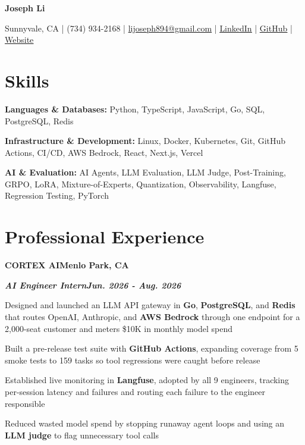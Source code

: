\documentclass[10pt]{article}
\renewcommand{\resumeheader}[2]{%
  {\centering\fontsize{16}{18}\selectfont\bfseries #1\par}%
  \vspace{4pt}%
  {\centering\fontsize{10.5}{13}\selectfont #2\par}%
  \vspace{6pt}%
}
\renewcommand{\skill}[2]{\textbf{#1:} #2\par\vspace{1.5pt}}
\newcommand{\job}[4]{%
  \vspace{0pt}%
  \textbf{\MakeUppercase{#1}}\hfill\textbf{#2}\par
  \vspace{0.5pt}%
  \textbf{\textit{#3}}\hfill\textbf{\textit{#4}}\par
}
\begin{document}
\resumeheader{Joseph Li}{%
Sunnyvale, CA | (734) 934-2168 | \href{mailto:lijoseph894@gmail.com}{lijoseph894@gmail.com} | \href{https://www.linkedin.com/in/lijoseph894/}{\underline{LinkedIn}} | \href{https://github.com/josephl894}{\underline{GitHub}} | \href{https://josephl894.github.io}{\underline{Website}}}

\section{Skills}
\skill{Languages \& Databases}{Python, TypeScript, JavaScript, Go, SQL, PostgreSQL, Redis}
\skill{Infrastructure \& Development}{Linux, Docker, Kubernetes, Git, GitHub Actions, CI/CD, AWS Bedrock, React, Next.js, Vercel}
\skill{AI \& Evaluation}{AI Agents, LLM Evaluation, LLM Judge, Post-Training, GRPO, LoRA, Mixture-of-Experts, Quantization, Observability, Langfuse, Regression Testing, PyTorch}

\section{Professional Experience}
\job{Cortex AI}{Menlo Park, CA}{AI Engineer Intern}{Jun. 2026 - Aug. 2026}
\begin{bullets}
  \item Designed and launched an LLM API gateway in \textbf{Go}, \textbf{PostgreSQL}, and \textbf{Redis} that routes OpenAI, Anthropic, and \textbf{AWS Bedrock} through one endpoint for a 2,000-seat customer and meters \$10K in monthly model spend
  \item Built a pre-release test suite with \textbf{GitHub Actions}, expanding coverage from 5 smoke tests to 159 tasks so tool regressions were caught before release
  \item Established live monitoring in \textbf{Langfuse}, adopted by all 9 engineers, tracking per-session latency and failures and routing each failure to the engineer responsible
  \item Reduced wasted model spend by stopping runaway agent loops and using an \textbf{LLM judge} to flag unnecessary tool calls
\end{bullets}
\end{document}
